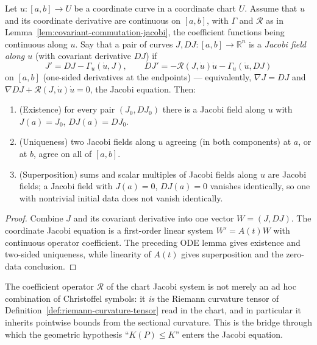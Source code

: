 \begin{lemma}
\label{lem:jacobi-field-coordinates}




Let $u\colon[a,b]\to U$ be a coordinate curve in a coordinate chart $U$.
Assume that $u$ and its coordinate derivative are continuous on $[a,b]$,
with $\Gamma$ and ${\mathcal R}$ as in
Lemma~\ref{lem:covariant-commutation-jacobi}, the coefficient
functions being continuous along $u$. Say that a pair of curves
$J,DJ\colon[a,b]\to\mathbb{R}^n$ is a {\em Jacobi field along $u$}
(with covariant derivative $DJ$) if
$$J'=DJ-\Gamma_u(\dot u,J),\qquad
DJ'=-{\mathcal R}(J,\dot u)\dot u-\Gamma_u(\dot u,DJ)$$
on $[a,b]$ (one-sided derivatives at the endpoints) — equivalently,
$\nabla J=DJ$ and $\nabla DJ+{\mathcal R}(J,\dot u)\dot u=0$, the
Jacobi equation. Then:
\begin{enumerate}
\item (Existence) for every pair $(J_0,DJ_0)$ there is a Jacobi
field along $u$ with $J(a)=J_0$, $DJ(a)=DJ_0$.
\item (Uniqueness) two Jacobi fields along $u$ agreeing (in both
components) at $a$, or at $b$, agree on all of $[a,b]$.
\item (Superposition) sums and scalar multiples of Jacobi fields
along $u$ are Jacobi fields; a Jacobi field with $J(a)=0$,
$DJ(a)=0$ vanishes identically, so one with nontrivial initial
data does not vanish identically.
\end{enumerate}
\end{lemma}

\begin{proof}
\sketch
{}
Combine $J$ and its covariant derivative into one vector $W=(J,DJ)$. The coordinate Jacobi equation is a first-order linear system $W'=A(t)W$ with continuous operator coefficient. The preceding ODE lemma gives existence and two-sided uniqueness, while linearity of $A(t)$ gives superposition and the zero-data conclusion.
\end{proof}

The coefficient operator ${\mathcal R}$ of the chart Jacobi system is
not merely an ad hoc combination of Christoffel symbols: it {\em is}
the Riemann curvature tensor of
Definition~\ref{def:riemann-curvature-tensor} read in the chart, and
in particular it inherits pointwise bounds from the sectional
curvature. This is the bridge through which the geometric hypothesis
``$K(P)\le K$'' enters the Jacobi equation.

